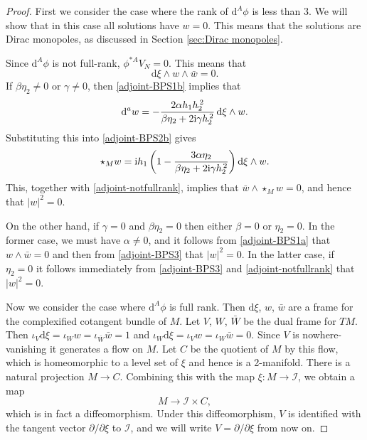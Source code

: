 \documentclass[pdftex]{sigma}
\newcommand{\II}{{\mathcal{I}}}
\newcommand{\1}{{\mathbb{1}}}
\newcommand{\lto}{\longrightarrow}
\def \d{\mathrm{d}}
\numberwithin{equation}{section}
\begin{document}
\begin{proof}
First we consider the case where the rank of $\d^A\phi$ is less than 3. We will show that in this case all solutions have $w=0$. This means that the solutions are Dirac monopoles, as discussed in Section \ref{sec:Dirac monopoles}.

Since $\d^A\phi$ is not full-rank, $\phi^{\ast A}V_N=0$. This means that \begin{equation}\label{adjoint-notfullrank}
\d\xi\wedge w\wedge\bar{w}=0.
\end{equation}
If $\beta\eta_2\neq0$ or $\gamma\neq0$, then \eqref{adjoint-BPS1b} implies that
\begin{equation}\label{adjoint-dw-solution}
\d^a w = -\frac{2\alpha h_1h_2^{\,2}}{\beta \eta_2 + 2{\rm i}\gamma h_2^{\,2}}\,\d\xi\wedge w.
\end{equation}
Substituting this into \eqref{adjoint-BPS2b} gives
\begin{equation*}
\star_{M}w = {\rm i}h_1\left(1-\frac{3\alpha \eta_2}{\beta \eta_2 + 2{\rm i}\gamma h_2^{\,2}}\right)\d\xi\wedge w.
\end{equation*}
This, together with \eqref{adjoint-notfullrank}, implies that $\bar{w}\wedge\star_{M}w=0$, and hence that $|w|^2=0$.

On the other hand, if $\gamma=0$ and $\beta\eta_2=0$ then either $\beta=0$ or $\eta_2=0$. In the former case, we must have $\alpha\neq0$, and it follows from \eqref{adjoint-BPS1a} that $w\wedge\bar{w}=0$ and then from \eqref{adjoint-BPS3} that $|w|^2=0$. In the latter case, if $\eta_2=0$ it follows immediately from \eqref{adjoint-BPS3} and \eqref{adjoint-notfullrank} that $|w|^2=0$.

Now we consider the case where $\d^A\phi$ is full rank. Then $\d\xi$, $w$, $\bar{w}$ are a frame for the complexified cotangent bundle of $M$. Let $V$, $W$, $\bar{W}$ be the dual frame for $TM$. Then $\iota_V\d\xi=\iota_W w=\iota_{\bar{W}}\bar{w}=1$ and $\iota_W\d\xi=\iota_Vw=\iota_W\bar{w}=0$. Since $V$ is nowhere-vanishing it generates a flow on $M$. Let $C$ be the quotient of $M$ by this flow, which is homeomorphic to a level set of $\xi$ and hence is a 2-manifold. There is a natural projection $M\to C$. Combining this with the map $\xi\colon M\to\II$, we obtain a map
\begin{equation*}
M\lto \II\times C,
\end{equation*}
which is in fact a diffeomorphism. Under this diffeomorphism, $V$ is identified with the tangent vector $\partial/\partial\xi$ to $\II$, and we will write $V=\partial/\partial\xi$ from now on.


\end{proof}
\end{document}
